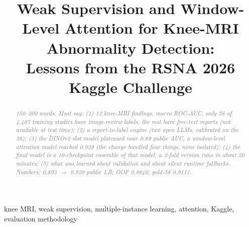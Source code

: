 \documentclass[conference]{IEEEtran}
\newcommand{\nt}[1]{\textcolor{gray}{\textit{#1}}}            %
\begin{document}
\title{Weak Supervision and Window-Level Attention for Knee-MRI Abnormality Detection:\\
Lessons from the RSNA 2026 Kaggle Challenge}   %

\author{
}

\maketitle

\begin{abstract}
\nt{150--200 words. Must say: (1) 12 knee-MRI findings, macro ROC-AUC, only 58 of 4,407 training studies have
image-review labels, the rest have free-text reports (not available at test time); (2) a report-to-label engine
(two open LLMs, calibrated on the 58); (3) the DINOv2 slot model plateaued near 0.89 public AUC, a window-level
attention model reached 0.929 (the change bundled four things, none isolated); (4) the final model is a 10-checkpoint
ensemble of that model; a 2-fold version runs in about 20 minutes; (5) what was learned about validation and about
silent runtime fallbacks. Numbers: 0.893 $\rightarrow$ 0.929 public LB; OOF 0.8840; gold-58 0.9111.}
\end{abstract}

\begin{IEEEkeywords}
knee MRI, weak supervision, multiple-instance learning, attention, Kaggle, evaluation methodology
\end{IEEEkeywords}

\end{document}
